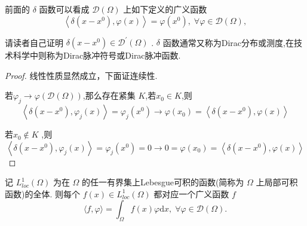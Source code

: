 \documentclass[lang=cn,newtx,10pt,scheme=chinese,thmcnt=chapter]{elegantbook}
\newcommand{\dif}{\mathrm{d}}
\begin{document}
\begin{example}
前面的 \(\delta\) 函数可以看成 \(\mathcal{D}\left( \Omega \right)\) 上如下定义的广义函数
\begin{equation*}
\left\langle  {\delta \left( {x - {x}^{0}}\right) ,\varphi \left( x\right) }\right\rangle   = \varphi \left( {x}^{0}\right) ,\;\forall \varphi  \in  \mathcal{D}\left( \Omega \right) ,
\end{equation*}

请读者自己证明 \(\delta \left( {x - {x}^{0}}\right)  \in  {\mathcal{D}}^{\prime }\left( \Omega \right)\) . \(\delta\) 函数通常又称为Dirac分布或测度,在技术科学中则称为Dirac脉冲符号或Dirac脉冲函数.
\end{example}
\begin{proof}
    线性性质显然成立，下面证连续性.

    若${\varphi }_{j} \rightarrow  \varphi \left( {\mathcal{D}\left( \Omega \right) }\right)$,那么存在紧集 $K$,若$x_0\in K$,则
\[\left\langle  {\delta \left( {x - {x}^{0}}\right) ,\varphi_j \left( x\right) }\right\rangle   = \varphi_j \left( {x}^{0}\right)\to \varphi(x_0) =\left\langle  {\delta \left( {x - {x}^{0}}\right) ,\varphi \left( x\right) }\right\rangle \]

若$x_0\notin K$ ,则
\[\left\langle  {\delta \left( {x - {x}^{0}}\right) ,\varphi_j \left( x\right) }\right\rangle   = \varphi_j \left( {x}^{0}\right)=0\to 0= \varphi(x_0) =\left\langle  {\delta \left( {x - {x}^{0}}\right) ,\varphi \left( x\right) }\right\rangle \]
\end{proof}
\begin{example}
  记 \({L}_{loc}^{1}\left( \Omega \right)\) 为在 \(\Omega\) 的任一有界集上Lebesgue可积的函数(简称为 \(\Omega\) 上局部可积函数)的全体. 则每个 \(f\left( x\right)  \in  {L}_{loc}^{1}\left( \Omega \right)\) 都对应一个广义函数 \(f\)
\begin{equation}
\langle f,\varphi \rangle  = {\int }_{\Omega }f\left( x\right) {\varphi \dif x},\;\forall \varphi  \in  \mathcal{D}\left( \Omega \right) . \label{3.5}
\end{equation}

\end{example}
\end{document}
